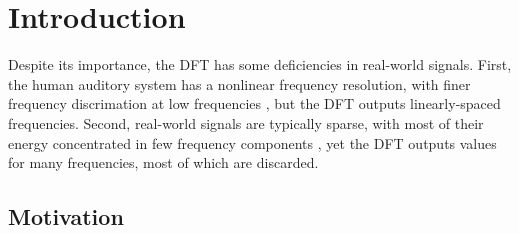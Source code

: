\documentclass[letter,12pt]{article}
\title{\ThesisTitle}
\author{\vspace{2em}\\Sevag Hanssian \\
  McGill University \\
 \texttt{sevag.hanssian@mail.mcgill.ca} \\
 \texttt{sevagh@protonmail.com} \\\ \\\ \\
 Thesis for Master of Arts in Music Technology}
\date{}
\begin{document}
\maketitle

\vfill
\clearpage %

\tableofcontents

\vfill
\clearpage %

\listoffigures

\listoflistings

\vfill
\clearpage %

\begin{abstract}
	The discrete Fourier transform (DFT), along with the Fast Fourier Transform (FFT) \cite{cooleytukey} algorithm for its efficient computation, rank among the most important algorithms in applied engineering and computer science \cite{dftimportant}. The DFT is used in digital signal processing applications to decompose a discrete-time acoustic signal into a sum of its frequency components, generating a spectrum to perform what is known as spectral or frequency analysis. This Master's thesis first proposes to describe and implement the sparse, pruned, nonuniform, warped, and fractional variants of the DFT or FFT. Next, the use of the standard DFT and FFT in real-world music systems will be revisited to explore whether using the variants can be beneficial. The main result achieved is that a combination of several of the variants showed a reduction in computational footprint and improvement in accuracy in a recent state-of-the-art music system.
\end{abstract}

\section{Introduction}
\label{sec:intro}

   Despite its importance, the DFT has some deficiencies in real-world signals. First, the human auditory system has a nonlinear frequency resolution, with finer frequency discrimation at low frequencies , but the DFT outputs linearly-spaced frequencies. Second, real-world signals are typically sparse, with most of their energy concentrated in few frequency components \cite{sparseintro}, yet the DFT outputs values for many frequencies, most of which are discarded.

\subsection{Motivation}
\end{document}
